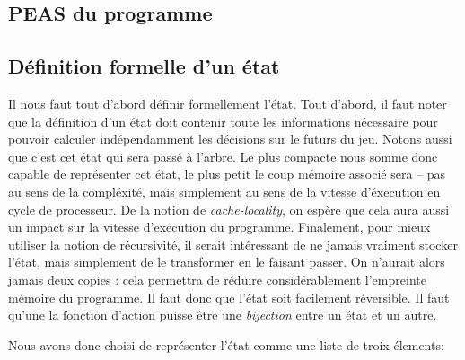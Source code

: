 \documentclass[a4paper,11pt]{article}
\begin{document}
\begin{multicols}{2}[]
  \subsection{PEAS du programme}


  \subsection{Définition formelle d'un état}

    Il nous faut tout d'abord définir formellement l'état. Tout d'abord, il
    faut noter que la définition d'un état doit contenir toute les informations
    nécessaire pour pouvoir calculer indépendamment les décisions sur le futurs
    du jeu. Notons aussi que c'est cet état qui sera passé à l'arbre. Le plus
    compacte nous somme donc capable de représenter cet état, le plus petit le
    coup mémoire associé sera -- pas au sens de la compléxité, mais simplement
    au sens de la vitesse d'éxecution en cycle de processeur. De la notion de
    \emph{cache-locality}, on espère que cela aura aussi un impact sur la
    vitesse d'execution du programme. Finalement, pour mieux utiliser la notion
    de récursivité, il serait intéressant de ne jamais vraiment stocker l'état,
    mais simplement de le transformer en le faisant passer. On n'aurait alors
    jamais deux copies : cela permettra de réduire considérablement l'empreinte
    mémoire du programme. Il faut donc que l'état soit facilement réversible.
    Il faut qu'une la fonction d'action puisse être une \emph{bijection} entre
    un état et un autre.

    Nous avons donc choisi de représenter l'état comme une liste de troix
    élements:


\end{multicols}
\end{document}
